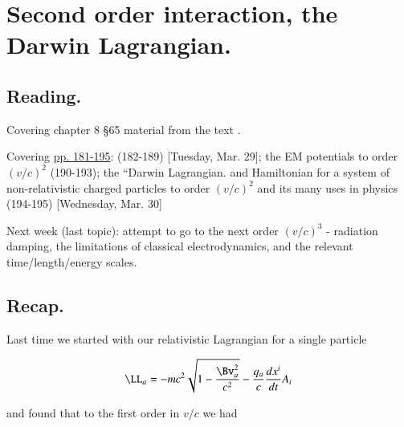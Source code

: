 %
%

\chapter{Second order interaction, the Darwin Lagrangian.}
\label{chap:relativisticElectrodynamicsL25}
{}
\date{Mar 31, 2011}

\beginArtNoToc

\section{Reading.}

Covering chapter 8 \S 65 material from the text \cite{landau1980classical}.

Covering \href{http://www.physics.utoronto.ca/~poppitz/epoppitz/PHY450_files/RelEMpp181-195.pdf}{pp. 181-195}: (182-189) [Tuesday, Mar. 29]; the EM potentials to order $(v/c)^2$ (190-193); the ``Darwin Lagrangian.  and Hamiltonian for a system of non-relativistic charged particles to order $(v/c)^2$ and its many uses in physics (194-195) [Wednesday, Mar. 30]

Next week (last topic): attempt to go to the next order $(v/c)^3$ - radiation damping, the limitations of classical electrodynamics, and the relevant time/length/energy scales.

\section{Recap.}

Last time we started with our relativistic Lagrangian for a single particle

\begin{equation}\label{eqn:relativisticElectrodynamicsL25:n}
\LL_a = - m c^2 \sqrt{ 1 - \frac{\Bv_a^2}{c^2} } - \frac{q_a}{c} \frac{dx^i}{dt} A_i
\end{equation}

and found that to the first order in $v/c$ we had

